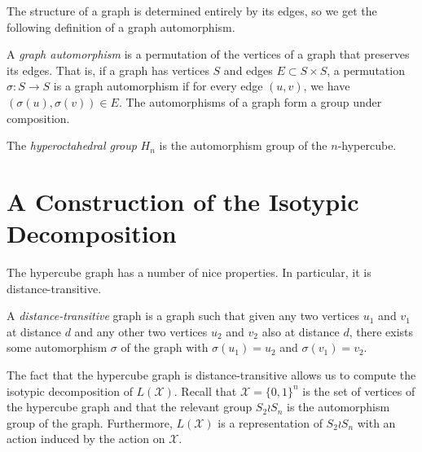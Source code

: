 \documentclass[cclicense]{hmcthesis}
\providecommand*{\xs}{\mathcal X}
\numberwithin{equation}{chapter}
\numberwithin{thmcounter}{chapter}
\begin{document}
    The structure of a graph is determined entirely by its edges, so we get the
    following definition of a graph automorphism.
    \begin{definition}
        A \emph{graph automorphism} is a permutation of the vertices of a graph
        that preserves its edges.  That is, if a graph has vertices $S$ and
        edges $E \subset S \times S$, a permutation $\sigma: S \to S$ is a graph
        automorphism if for every edge $(u, v)$, we have $(\sigma(u), \sigma(v))
        \in E$.  The automorphisms of a graph form a group under composition.
    \end{definition}

    \begin{definition}
        The \emph{hyperoctahedral group} $H_n$ is the automorphism group of the
        $n$-hypercube.
    \end{definition}

\section{A Construction of the Isotypic Decomposition}
    The hypercube graph has a number of nice properties.  In particular, it is
    distance-transitive. 
    \begin{definition}
        A \emph{distance-transitive} graph is a graph such that given any two
        vertices $u_1$ and $v_1$ at distance $d$ and any other two vertices
        $u_2$ and $v_2$ also at distance $d$, there exists some automorphism
        $\sigma$ of the graph with $\sigma(u_1) = u_2$ and $\sigma(v_1) = v_2$.
    \end{definition}
    The fact that the hypercube graph is distance-transitive allows us to
    compute the isotypic decomposition of $L(\xs)$.  Recall that $\xs = \{0,
    1\}^n$ is the set of vertices of the hypercube graph and that the relevant
    group $S_2 \wr S_n$ is the automorphism group of the graph.  Furthermore,
    $L(\xs)$ is a representation of $S_2 \wr S_n$ with an action induced by the
    action on $\xs$.
\end{document}
